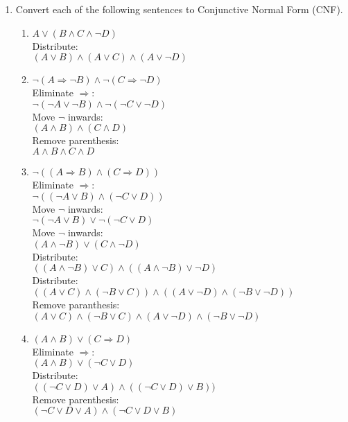 \documentclass[paper=a4, fontsize=11pt]{scrartcl} %
\numberwithin{equation}{section} %
\numberwithin{figure}{section} %
\numberwithin{table}{section} %
\begin{document}
\begin{enumerate}
	\item
	Convert each of the following sentences to Conjunctive Normal Form (CNF).
	\begin{enumerate}
		\item 
		$A \vee (B \wedge C \wedge \neg D)$
		\\Distribute:\\
		$(A \vee B) \wedge (A \vee C) \wedge (A \vee \neg D)$

		\item
		$\neg(A \Rightarrow \neg B) \wedge \neg (C \Rightarrow \neg D)$
		\\Eliminate $\Rightarrow$:\\
		$\neg (\neg A \vee \neg B) \wedge \neg(\neg C \vee \neg D)$
		\\Move $\neg$ inwards:\\
		$(A \wedge B) \wedge (C \wedge D)$
		\\Remove parenthesis:\\
		$A \wedge B \wedge C \wedge D$

		\item
		$\neg((A \Rightarrow B) \wedge (C \Rightarrow D))$
		\\Eliminate $\Rightarrow$:\\
		$\neg((\neg A \vee B) \wedge (\neg C \vee D))$
		\\Move $\neg$ inwards:\\
		$\neg(\neg A \vee B) \vee \neg(\neg C \vee D)$
		\\Move $\neg$ inwards:\\
		$(A \wedge \neg B) \vee (C \wedge \neg D)$
		\\Distribute:\\
		$((A \wedge \neg B) \vee C) \wedge ((A \wedge \neg B) \vee \neg D)$
		\\Distribute:\\
		$((A \vee C) \wedge (\neg B \vee C)) \wedge ((A \vee \neg D) \wedge (\neg B \vee \neg D))$
		\\Remove paranthesis:\\
		$(A \vee C) \wedge (\neg B \vee C) \wedge (A \vee \neg D) \wedge (\neg B \vee \neg D)$

		\item 
		$(A \wedge B) \vee (C \Rightarrow D)$
		\\Eliminate $\Rightarrow$:\\
		$(A \wedge B) \vee (\neg C \vee D)$
		\\Distribute:\\
		$((\neg C \vee D) \vee A) \wedge ((\neg C \vee D) \vee B))$
		\\Remove parenthesis:\\
		$(\neg C \vee D \vee A) \wedge (\neg C \vee D \vee B)$
		

\end{enumerate}
\end{enumerate}
\end{document}
